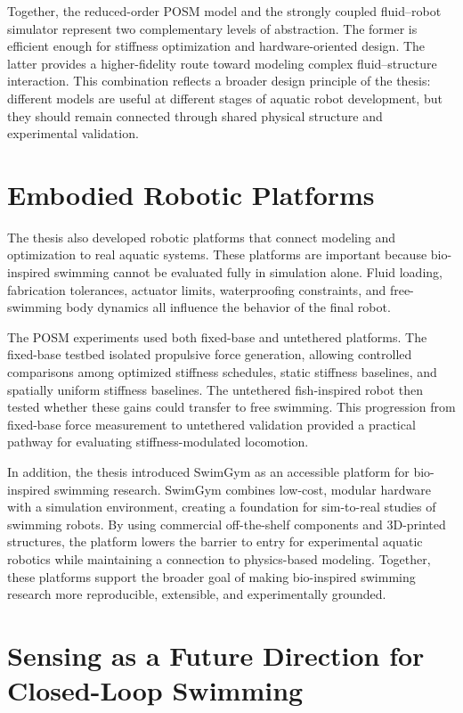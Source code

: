 Together, the reduced-order POSM model and the strongly coupled fluid--robot simulator represent two complementary levels of abstraction. The former is efficient enough for stiffness optimization and hardware-oriented design. The latter provides a higher-fidelity route toward modeling complex fluid--structure interaction. This combination reflects a broader design principle of the thesis: different models are useful at different stages of aquatic robot development, but they should remain connected through shared physical structure and experimental validation.

\section{Embodied Robotic Platforms}

The thesis also developed robotic platforms that connect modeling and optimization to real aquatic systems. These platforms are important because bio-inspired swimming cannot be evaluated fully in simulation alone. Fluid loading, fabrication tolerances, actuator limits, waterproofing constraints, and free-swimming body dynamics all influence the behavior of the final robot.

The POSM experiments used both fixed-base and untethered platforms. The fixed-base testbed isolated propulsive force generation, allowing controlled comparisons among optimized stiffness schedules, static stiffness baselines, and spatially uniform stiffness baselines. The untethered fish-inspired robot then tested whether these gains could transfer to free swimming. This progression from fixed-base force measurement to untethered validation provided a practical pathway for evaluating stiffness-modulated locomotion.

In addition, the thesis introduced SwimGym as an accessible platform for bio-inspired swimming research. SwimGym combines low-cost, modular hardware with a simulation environment, creating a foundation for sim-to-real studies of swimming robots. By using commercial off-the-shelf components and 3D-printed structures, the platform lowers the barrier to entry for experimental aquatic robotics while maintaining a connection to physics-based modeling. Together, these platforms support the broader goal of making bio-inspired swimming research more reproducible, extensible, and experimentally grounded.

\section{Sensing as a Future Direction for Closed-Loop Swimming}

